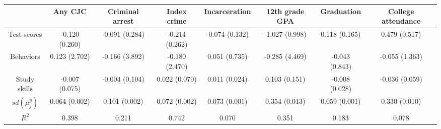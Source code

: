 \begin{tabular}{cccccccc}
\toprule
 & Any CJC & Criminal arrest & Index crime & Incarceration & 12th grade GPA & Graduation & College attendance \\
\midrule
Test scores & -0.120 (0.260) & -0.091 (0.284) & -0.214 (0.262) & -0.074 (0.132) & -1.027 (0.998) & 0.118 (0.165) & 0.479 (0.517) \\
Behaviors & 0.123 (2.702) & -0.166 (3.892) & -0.180 (2.470) & 0.051 (0.735) & -0.285 (4.469) & -0.043 (0.843) & -0.055 (1.363) \\
Study skills & -0.007 (0.075) & -0.004 (0.104) & 0.022 (0.070) & 0.011 (0.024) & 0.103 (0.151) & -0.008 (0.028) & -0.036 (0.059) \\
\hline $sd(\mu_j^y)$ & 0.064 (0.002) & 0.101 (0.002) & 0.072 (0.002) & 0.073 (0.001) & 0.354 (0.013) & 0.059 (0.001) & 0.330 (0.010) \\
$R^2$ & 0.398 & 0.211 & 0.742 & 0.070 & 0.351 & 0.183 & 0.078 \\
\bottomrule
\end{tabular}
